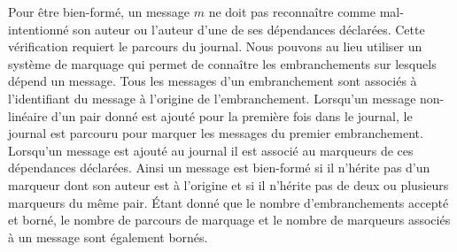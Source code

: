 %
%

Pour être bien-formé, un message $m$ ne doit pas reconnaître comme mal-intentionné son auteur ou l'auteur d'une de ses dépendances déclarées.
Cette vérification requiert le parcours du journal.
Nous pouvons au lieu utiliser un système de marquage qui permet de connaître les embranchements sur lesquels dépend un message.
Tous les messages d'un embranchement sont associés à l'identifiant du message à l'origine de l'embranchement.
Lorsqu'un message non-linéaire d'un pair donné est ajouté pour la première fois dans le journal, le journal est parcouru pour marquer les messages du premier embranchement.
Lorsqu'un message est ajouté au journal il est associé au marqueurs de ces dépendances déclarées.
Ainsi un message est bien-formé si il n'hérite pas d'un marqueur dont son auteur est à l'origine et si il n'hérite pas de deux ou plusieurs marqueurs du même pair.
Étant donné que le nombre d'embranchements accepté et borné, le nombre de parcours de marquage et le nombre de marqueurs associés à un message sont également bornés.

